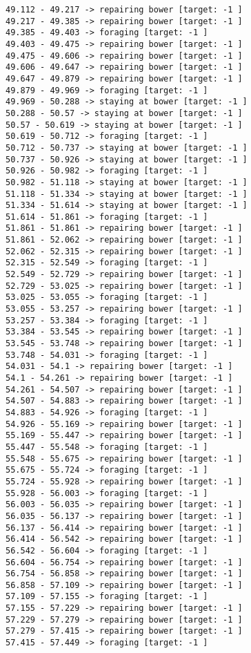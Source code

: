 \documentclass[11pt]{article}
\begin{document}
\begin{Verbatim}[commandchars=\\\{\}]
49.112 - 49.217 -> repairing bower [target: -1 ]
49.217 - 49.385 -> repairing bower [target: -1 ]
49.385 - 49.403 -> foraging [target: -1 ]
49.403 - 49.475 -> repairing bower [target: -1 ]
49.475 - 49.606 -> repairing bower [target: -1 ]
49.606 - 49.647 -> repairing bower [target: -1 ]
49.647 - 49.879 -> repairing bower [target: -1 ]
49.879 - 49.969 -> foraging [target: -1 ]
49.969 - 50.288 -> staying at bower [target: -1 ]
50.288 - 50.57 -> staying at bower [target: -1 ]
50.57 - 50.619 -> staying at bower [target: -1 ]
50.619 - 50.712 -> foraging [target: -1 ]
50.712 - 50.737 -> staying at bower [target: -1 ]
50.737 - 50.926 -> staying at bower [target: -1 ]
50.926 - 50.982 -> foraging [target: -1 ]
50.982 - 51.118 -> staying at bower [target: -1 ]
51.118 - 51.334 -> staying at bower [target: -1 ]
51.334 - 51.614 -> staying at bower [target: -1 ]
51.614 - 51.861 -> foraging [target: -1 ]
51.861 - 51.861 -> repairing bower [target: -1 ]
51.861 - 52.062 -> repairing bower [target: -1 ]
52.062 - 52.315 -> repairing bower [target: -1 ]
52.315 - 52.549 -> foraging [target: -1 ]
52.549 - 52.729 -> repairing bower [target: -1 ]
52.729 - 53.025 -> repairing bower [target: -1 ]
53.025 - 53.055 -> foraging [target: -1 ]
53.055 - 53.257 -> repairing bower [target: -1 ]
53.257 - 53.384 -> foraging [target: -1 ]
53.384 - 53.545 -> repairing bower [target: -1 ]
53.545 - 53.748 -> repairing bower [target: -1 ]
53.748 - 54.031 -> foraging [target: -1 ]
54.031 - 54.1 -> repairing bower [target: -1 ]
54.1 - 54.261 -> repairing bower [target: -1 ]
54.261 - 54.507 -> repairing bower [target: -1 ]
54.507 - 54.883 -> repairing bower [target: -1 ]
54.883 - 54.926 -> foraging [target: -1 ]
54.926 - 55.169 -> repairing bower [target: -1 ]
55.169 - 55.447 -> repairing bower [target: -1 ]
55.447 - 55.548 -> foraging [target: -1 ]
55.548 - 55.675 -> repairing bower [target: -1 ]
55.675 - 55.724 -> foraging [target: -1 ]
55.724 - 55.928 -> repairing bower [target: -1 ]
55.928 - 56.003 -> foraging [target: -1 ]
56.003 - 56.035 -> repairing bower [target: -1 ]
56.035 - 56.137 -> repairing bower [target: -1 ]
56.137 - 56.414 -> repairing bower [target: -1 ]
56.414 - 56.542 -> repairing bower [target: -1 ]
56.542 - 56.604 -> foraging [target: -1 ]
56.604 - 56.754 -> repairing bower [target: -1 ]
56.754 - 56.858 -> repairing bower [target: -1 ]
56.858 - 57.109 -> repairing bower [target: -1 ]
57.109 - 57.155 -> foraging [target: -1 ]
57.155 - 57.229 -> repairing bower [target: -1 ]
57.229 - 57.279 -> repairing bower [target: -1 ]
57.279 - 57.415 -> repairing bower [target: -1 ]
57.415 - 57.449 -> foraging [target: -1 ]

\end{Verbatim}
\end{document}

